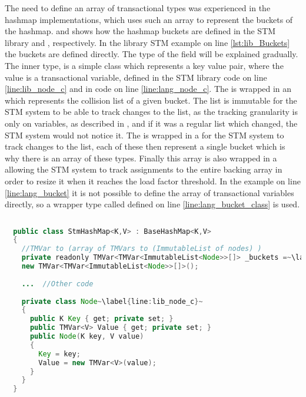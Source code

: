 The need to define an array of transactional types was experienced in the hashmap implementations, which uses such an array to represent the buckets of the hashmap.  and  shows how the hashmap buckets are defined in the \ac{STM} library and \stmname, respectively. In the library \ac{STM} example on line \ref{lst:lib_Buckets} the buckets are defined directly. The type of the  field will be explained gradually. The inner  type, is a simple class which represents a key value pair, where the value is a transactional variable, defined in the \ac{STM} library code on line \ref{line:lib_node_c} and in \stmname code on line \ref{line:lang_node_c}. The  is wrapped in an  which represents the collision list of a given bucket. The list is immutable for the \ac{STM} system to be able to track changes to the list, as the tracking granularity is only on variables, as described in , and if it was a regular list which changed, the \ac{STM} system would not notice it. The  is wrapped in a  for the \ac{STM} system to track changes to the list, each of these then represent a single bucket which is why there is an array of these types. Finally this array is also wrapped in a  allowing the \ac{STM} system to track assignments to the entire backing array in order to resize it when it reaches the load factor threshold. In the \stmname example on line \ref{line:lang_bucket} it is not possible to define the array of transactional variables directly, so a wrapper type called  defined on line \ref{line:lang_bucket_class} is used.

\begin{lstlisting}[label=lst:lib_Buckets,
  caption={HashMap Buckets Array - \ac{STM} Library},
  language=Java,  
  showspaces=false,
  showtabs=false,
  breaklines=true,
  showstringspaces=false,
  breakatwhitespace=true,
  escapechar=~,
  commentstyle=\color{greencomments},
  keywordstyle=\color{bluekeywords},
  stringstyle=\color{redstrings},
  morekeywords={atomic, retry, orelse, var, get, set, ref, out}]  % Start your code-block
  
  public class StmHashMap<K,V> : BaseHashMap<K,V>
  {
    //TMVar to (array of TMVars to (ImmutableList of nodes) )
    private readonly TMVar<TMVar<ImmutableList<Node>>[]> _buckets =~\label{line:lib_bucket}~
    new TMVar<TMVar<ImmutableList<Node>>[]>();
  
    ...  //Other code
  
    private class Node~\label{line:lib_node_c}~
    {
      public K Key { get; private set; }
      public TMVar<V> Value { get; private set; }
      public Node(K key, V value)
      {
        Key = key;
        Value = new TMVar<V>(value);
      }
    }
  }
\end{lstlisting}


